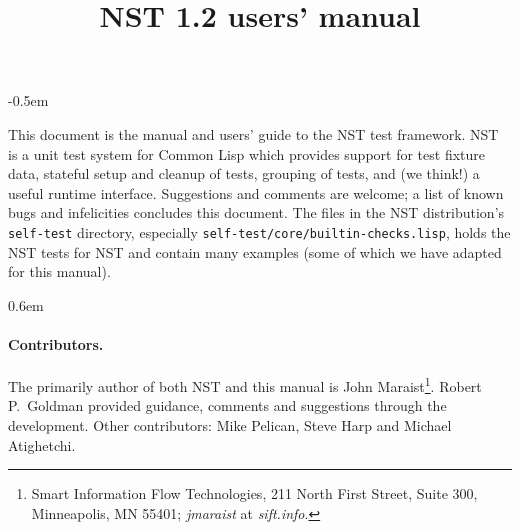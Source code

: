 \documentclass{article}
\title{NST 1.2 users' manual}
\begin{document}
\maketitle
\thispagestyle{empty}
\parskip -0.5em

\noindent This document is the manual and users' guide to the NST test
framework.  NST is a unit test system for Common Lisp which provides
support for test fixture data, stateful setup and cleanup of tests,
grouping of tests, and (we think!) a useful runtime interface.
Suggestions and comments are welcome; a list of known bugs and
infelicities concludes this document.  The files in the NST
distribution's \texttt{self-test} directory, especially
\texttt{self-test/core/builtin-checks.lisp}, holds the NST tests for
NST and contain many examples (some of which we have adapted for this
manual).

\tableofcontents
\parskip 0.6em
\parindent 0pt

\paragraph{Contributors.}
The primarily author of both NST and this manual is John
Maraist\footnote{Smart Information Flow Technologies, 211 North First
  Street, Suite 300, Minneapolis, MN 55401; \textsl{jmaraist} at
  \textsl{sift.info}.}.  Robert P.\ Goldman provided guidance,
comments and suggestions through the development.  Other contributors:
Mike Pelican, Steve Harp and Michael Atighetchi.
\cleardoublepage
{}








\appendix
{}


\printindex
\end{document}
